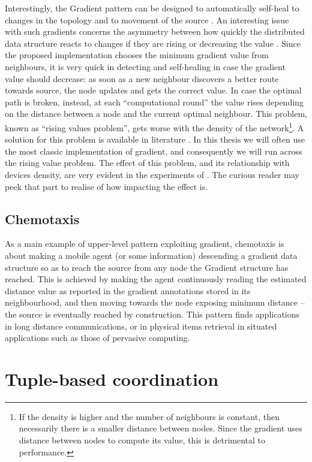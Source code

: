 \documentclass[12pt,a4paper,twoside,openright]{book}
\begin{document}
Interestingly, the Gradient pattern can be designed to automatically self-heal to changes in the topology and to movement of the source \cite{flexiblegradients}.
%
An interesting issue with such gradients concerns the asymmetry between how quickly the distributed data structure reacts to changes if they are rising or decreasing the value \cite{crf}.
%
Since the proposed implementation chooses the minimum gradient value from neighbours, it is very quick in detecting and self-healing in case the gradient value should decrease: as soon as a new neighbour discovers a better route towards source, the node updates and gets the correct value.
%
In case the optimal path is broken, instead, at each ``computational round'' the value rises depending on the distance between a node and the current optimal neighbour.
%
This problem, known as ``rising values problem'', gets worse with the density of the network\footnote{If the density is higher and the number of neighbours is constant, then necessarily there is a smaller distance between nodes. Since the gradient uses distance between nodes to compute its value, this is detrimental to performance.}.
%
A solution for this problem is available in literature \cite{crf}.
%
In this thesis we will often use the most classic implementation of gradient, and consequently we will run across the rising value problem.
%
The effect of this problem, and its relationship with devices density, are very evident in the experiments of .
%
The curious reader may peek that part to realise of how impacting the effect is.

\subsection{Chemotaxis}

As a main example of upper-level pattern exploiting gradient, chemotaxis is about making a mobile agent (or some information) descending a gradient data structure so as to reach the source from any node the Gradient structure has reached.
%
This is achieved by making the agent continuously reading the estimated distance value as reported in the gradient annotations stored in its neighbourhood, and then moving towards the node exposing minimum distance -- the source is eventually reached by construction.
%
This pattern finds applications in long distance communications, or in physical items retrieval in situated applications such as those of pervasive computing.

\section{Tuple-based coordination}
\end{document}
